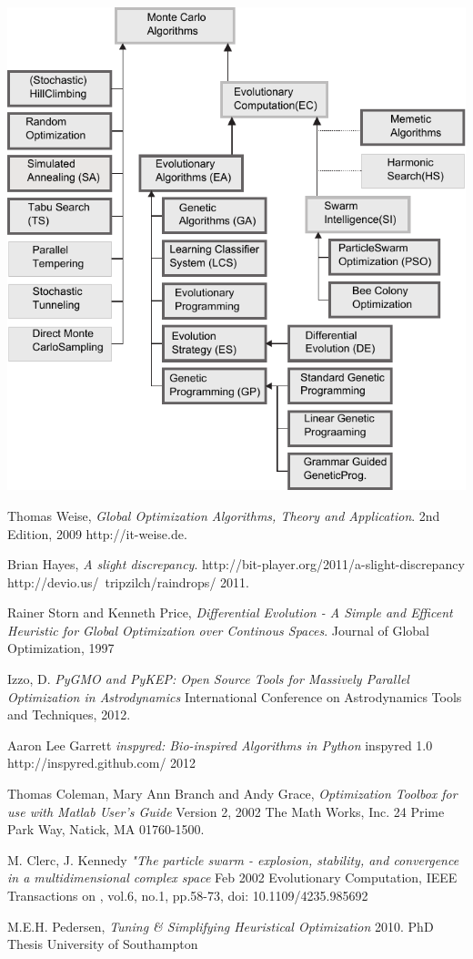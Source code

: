 \documentclass[a4paper,titlepage]{report}
\begin{document}
\includegraphics{Images/taxonomy_v2.pdf}


\newpage
\begin{thebibliography}{9}

  Thomas Weise,
  \emph{Global Optimization Algorithms, Theory and Application}.
  2nd Edition,
  2009
  http://it-weise.de.

  Brian Hayes,
  \emph{A slight discrepancy}.
  http://bit-player.org/2011/a-slight-discrepancy
  http://devio.us/~tripzilch/raindrops/
  2011.
  
    Rainer Storn and Kenneth Price,
    \emph{Differential Evolution - A Simple and Efficent Heuristic for Global Optimization over Continous Spaces}.
    Journal of Global Optimization,
    1997
    
    Izzo, D.
    \emph{PyGMO and PyKEP: Open Source Tools for Massively Parallel Optimization in Astrodynamics}
    International Conference on Astrodynamics Tools and Techniques,
    2012. 

    Aaron Lee Garrett
    \emph{inspyred: Bio-inspired Algorithms in Python}
    inspyred 1.0
    http://inspyred.github.com/
    2012
    
  Thomas Coleman, Mary Ann Branch and Andy Grace,
  \emph{Optimization Toolbox for use with Matlab User's Guide}
  Version 2,
  2002
  The Math Works, Inc.
  24 Prime Park Way, Natick, MA 01760-1500.
  
  M. Clerc, J. Kennedy
  \emph{"The particle swarm - explosion, stability, and convergence in a multidimensional complex space}
  Feb 2002
  Evolutionary Computation, IEEE Transactions on , vol.6, no.1, pp.58-73,
  doi: 10.1109/4235.985692

  M.E.H. Pedersen,
  \emph{Tuning \& Simplifying Heuristical Optimization}
  2010.  
  PhD Thesis
  University of Southampton

\end{thebibliography}
\end{document}
